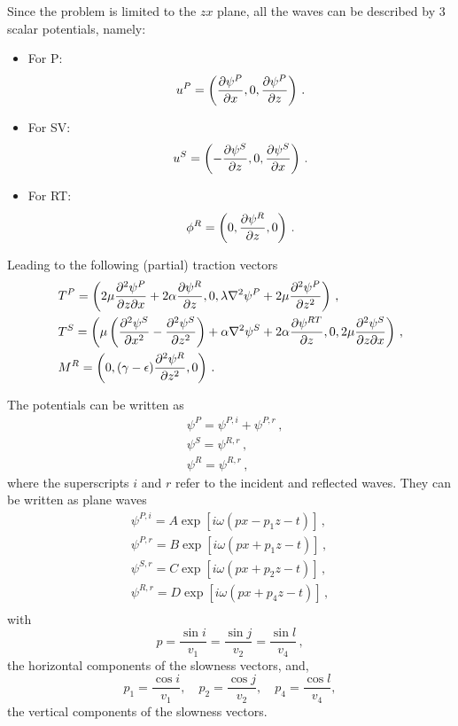 \documentclass[12pt]{article}
\begin{document}
Since the problem is limited to the \(zx\) plane, all the waves can be described by 3 scalar potentials, namely:
\begin{itemize}

\item For P:
\begin{displaymath}
  u^P = \left(\pdv{\psi^P}{x}, 0, \pdv{\psi^P}{z}\right)\, .
\end{displaymath}

\item For SV:
\begin{displaymath}
  u^S = \left(-\pdv{\psi^S}{z}, 0, \pdv{\psi^S}{x}\right)\, .
\end{displaymath}

\item For RT:
\begin{displaymath}
  \phi^{R} = \left(0, \pdv{\psi^{R}}{z}, 0\right)\, .
\end{displaymath}
\end{itemize}

Leading to the following (partial) traction vectors
\begin{align*}
&T^P = \left(2\mu\pdv{\psi^P}{z}{x} + 2\alpha\pdv{\psi^R}{z}, 0, \lambda\laplacian\psi^P + 2\mu\pdv[2]{\psi^P}{z}\right)\, ,\\
&T^S = \left(\mu\left(\pdv[2]{\psi^S}{x} - \pdv[2]{\psi^S}{z}\right) + \alpha\laplacian\psi^S + 2\alpha\pdv{\psi^{RT}}{z}, 0, 2\mu\pdv{\psi^S}{z}{x}\right)\, ,\\
&M^{R} = \left(0, (\gamma - \epsilon)\pdv[2]{\psi^{R}}{z}, 0\right)\, .
\end{align*}

The potentials can be written as
\begin{align*}
&\psi^P = \psi^{P,i} + \psi^{P,r}\, ,\\
&\psi^S = \psi^{R,r}\, ,\\
&\psi^R = \psi^{R,r}\, ,
\end{align*}
where the superscripts \(i\) and \(r\) refer to the incident and reflected waves. They can be written as plane waves
\begin{align*}
\psi^{P,i} = A\exp\left[i\omega(px - p_1z - t)\right]\, ,\\
\psi^{P,r} = B\exp\left[i\omega(px + p_1z - t)\right]\, ,\\
\psi^{S,r} = C\exp\left[i\omega(px + p_2z - t)\right]\, ,\\
\psi^{R,r} = D\exp\left[i\omega(px + p_4z - t)\right]\, ,\\
\end{align*}
with
\[p=\frac{\sin i}{v_1} = \frac{\sin j}{v_2} = \frac{\sin l}{v_4}\, ,\]
the horizontal components of the slowness vectors, and,
\[p_1 = \frac{\cos i}{v_1},\quad p_2 = \frac{\cos j}{v_2},\quad p_4 = \frac{\cos l}{v_4},\]
the vertical components of the slowness vectors.
\end{document}
